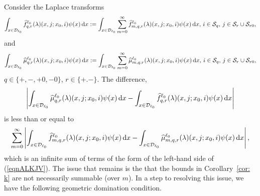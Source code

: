Consider the Laplace transforms 
\[\int_{x\in\mathcal{D}_{\ell_0}} \widehat f^{\ell_0}_{q,r}(\lambda)(x,j;x_0,i)\psi(x)\, \mathrm{d} x := \int_{x\in\mathcal{D}_{\ell_0}} \sum_{m=0}^\infty \widehat f^{\ell_0}_{m,q,r}(\lambda)(x,j;x_0,i)\psi(x) \, \mathrm{d} x,\,  i\in\mathcal{S}_q,\,j\in\mathcal{S}_r\cup\mathcal{S}_{r0},\]
and 
\[\int_{x\in\mathcal{D}_{\ell_0}} \widehat \mu^{\ell_0}_{q,r}(\lambda)( x,j;x_0,i)\psi(x) \, \mathrm{d} x := \int_{x\in\mathcal{D}_{\ell_0}} \sum_{m=0}^\infty \widehat \mu^{\ell_0}_{m,q,r}(\lambda)( x,j;x_0,i)\psi(x) \, \mathrm{d} x,\,  i\in\mathcal{S}_q,\,j\in\mathcal{S}_r\cup\mathcal{S}_{r0},\]
\(q\in\{+,-,+0,-0\}\), \(r\in\{+.-\}\). The difference, 
\[\left|\int_{x\in\mathcal{D}_{\ell_0}} \widehat \mu^{\ell_0}_{q,r}(\lambda)( x,j;x_0,i)\psi(x)\, \mathrm{d} x  - \int_{x\in\mathcal{D}_{\ell_0}} \widehat f^{\ell_0}_{q,r}(\lambda)(x,j;x_0,i)\psi(x) \, \mathrm{d} x \right|\] 
is less than or equal to 
\[\sum_{m=0}^\infty \left| \int_{x\in\mathcal{D}_{\ell_0}} \widehat f^{\ell_0}_{m,q,r}(\lambda)(x,j;x_0,i)\psi(x)\, \mathrm{d} x - \int_{x\in\mathcal{D}_{\ell_0}}  \widehat \mu^{\ell_0}_{m,q,r}(\lambda)(x,j;x_0,i)\psi(x) \, \mathrm{d} x\right|,\]
which is an infinite sum of terms of the form of the left-hand side of (\ref{eqnALKJV}). The issue that remains is the that the bounds in Corollary~\ref{cor: k} are not necessarily summable (over \(m\)). In a step to resolving this issue, we have the following geometric domination condition. 
%
